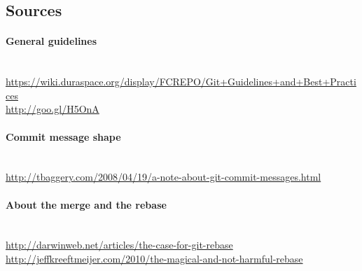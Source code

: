 \subsection{Sources}

\paragraph{General guidelines}~\\
\small{\url{https://wiki.duraspace.org/display/FCREPO/Git+Guidelines+and+Best+Practices}}\\
\small{\url{http://goo.gl/H5OnA}}\\

\paragraph{Commit message shape}~\\
\small{\url{http://tbaggery.com/2008/04/19/a-note-about-git-commit-messages.html}}\\

\paragraph{About the merge and the rebase}~\\
\small{\url{http://darwinweb.net/articles/the-case-for-git-rebase}}\\
\small{\url{http://jeffkreeftmeijer.com/2010/the-magical-and-not-harmful-rebase}}\\

%